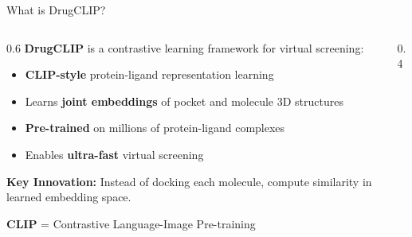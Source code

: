 \documentclass[aspectratio=169,xcolor=table]{beamer}
\begin{document}
\begin{frame}{What is DrugCLIP?}
\begin{columns}
\begin{column}{0.6\textwidth}
\textbf{DrugCLIP} is a contrastive learning framework for virtual screening:

\begin{itemize}\setlength{\itemsep}{2pt}
    \item \textcolor{drugblue}{\textbf{CLIP-style}} protein-ligand representation learning
    \item Learns \textbf{joint embeddings} of pocket and molecule 3D structures
    \item \textbf{Pre-trained} on millions of protein-ligand complexes
    \item Enables \textbf{ultra-fast} virtual screening
\end{itemize}

\vspace{0.2cm}
\textbf{Key Innovation:} Instead of docking each molecule, compute similarity in learned embedding space.

\vspace{0.2cm}
\footnotesize
\textbf{CLIP} = Contrastive Language-Image Pre-training
\end{column}

\begin{column}{0.4\textwidth}
\end{column}
\end{columns}
\end{frame}
\end{document}
